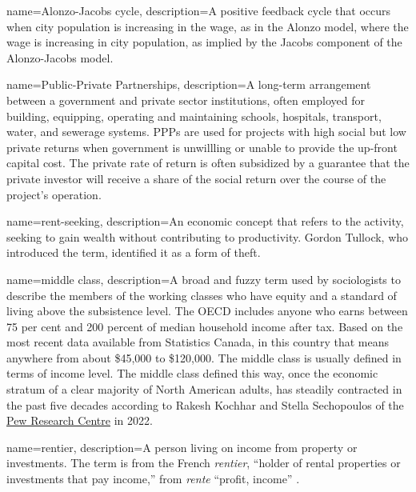 {
name=Alonzo-Jacobs cycle,
description={A positive \gls{feedback} cycle that occurs when city population is increasing in the wage, as in the Alonzo model, where the wage is increasing in city population, as implied by the Jacobs component of the \gls{Alonzo-Jacobs model}.}
}

{
name=Public-Private Partnerships,
description={A long-term arrangement between a government and private sector institutions, often  employed for building, equipping, operating and maintaining schools, hospitals, transport, water, and sewerage systems. PPPs are used for projects with high social but low private returns when government is unwillling or unable to provide the up-front capital cost. The private rate of return is often subsidized by a guarantee that the private investor will receive a share of the social return over the course of the project's operation.}
}

{
name=rent-seeking,
description={An economic concept that refers to the activity, seeking to gain wealth without contributing to productivity. Gordon Tullock, who introduced  the term, identified it as a form of theft\cite{tullockWelfareCostsTariffs1967}.}
}

{
name=middle class,
description={A broad and fuzzy term used by sociologists to describe the members of the working classes who have equity and a standard of living above the subsistence level. The OECD includes anyone who earns between 75 per cent and 200 percent of median household income after tax. Based on the most recent data available from Statistics Canada, in this country that means anywhere from about \$45,000 to \$120,000. The middle class is usually defined in terms of income level. The middle class defined this way, once the economic stratum of a clear majority of North American adults, has steadily contracted in the past five decades according to
Rakesh Kochhar and  Stella Sechopoulos of the \href{https://www.pewresearch.org/fact-tank/2022/04/20/how-the-american-middle-class-has-changed-in-the-past-five-decades/}{Pew Research Centre}  in 2022.}
}

{
name=rentier,
description={A person living on income from property or investments. The term is from the  French \textit{rentier}, ``holder of rental properties or investments that pay income,'' from \textit{rente} ``profit, income'' \cite{GET_rentier_defn_quote}. %
}
}

